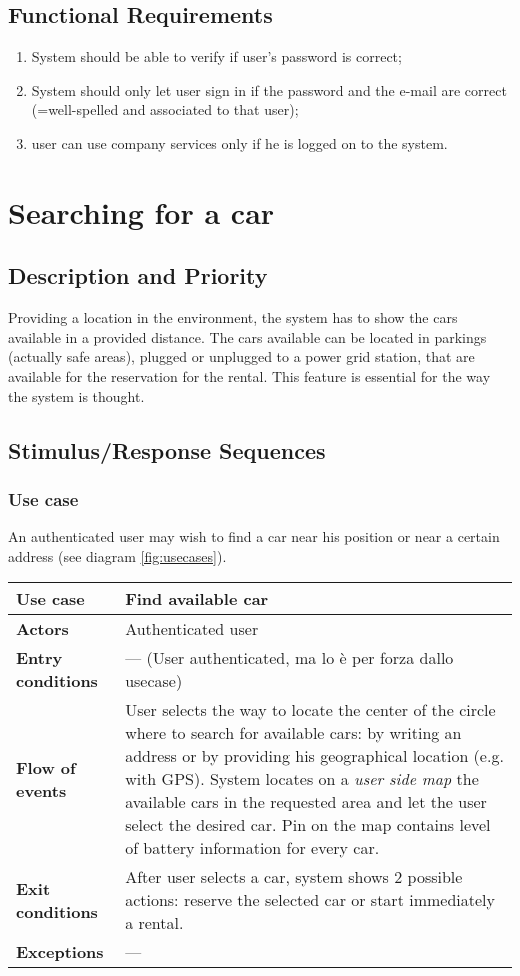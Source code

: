 \documentclass{scrreprt}
\begin{document}
\subsection{Functional Requirements}

\begin{enumerate}[label=R\arabic*.,resume]
\item System should be able to verify if user's password is correct;
\item System should only let user sign in if the password and the e-mail are correct (=well-spelled and associated to that user);
\item user can use company services only if he is logged on to the system.
\end{enumerate}

\section{Searching for a car}
\subsection{Description and Priority}
Providing a location in the environment, the system has to show the cars available in a provided distance. The cars available can be located in parkings (actually safe areas), plugged or unplugged to a power grid station, that are available for the reservation for the rental.
This feature is essential for the way the system is thought.
\subsection{Stimulus/Response Sequences}
\subsubsection{Use case}
An authenticated user may wish to find a car near his position or near a certain address (see diagram \vref{fig:usecases}).

\begin{center}
\begin{tabularx}{\columnwidth}{>{\bfseries}lX}
\toprule
Use case & Find available car\\
\midrule
Actors & Authenticated user\\
\midrule
Entry conditions & --- (User authenticated, ma lo è per forza dallo usecase)\\
\midrule
Flow of events & User selects the way to locate the center of the circle where to search for available cars: by writing an address or by providing his geographical location (e.g. with GPS). System locates on a \emph{user side map} the available cars in the requested area and let the user select the desired car. Pin on the map contains level of battery information for every car.\\
\midrule
Exit conditions & After user selects a car, system shows 2 possible actions: reserve the selected car or start immediately  a rental.\\
\midrule
Exceptions & ---\\
\bottomrule
\end{tabularx}
\end{center}
\end{document}
